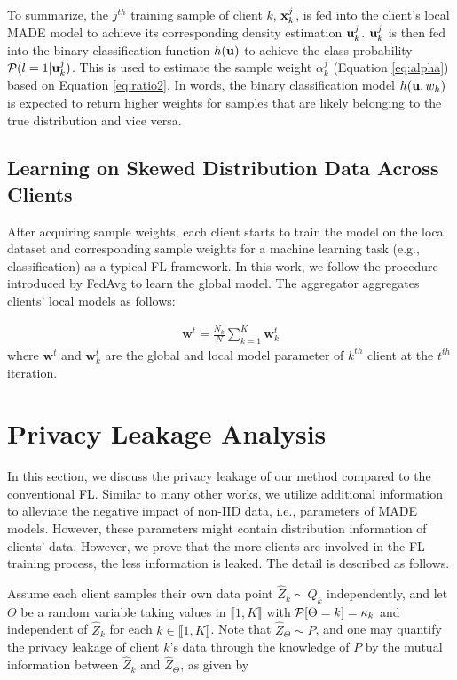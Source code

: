 To summarize, the $j^{th}$ training sample of client $k$, $\mathbf{x}_k^j$, is fed into the client's local MADE model to achieve its corresponding density estimation $\mathbf{u}{}_k^j$. $\mathbf{u}{}_k^j$ is then fed into the binary classification function $h(\mathbf{u})$ to achieve the class probability $ \mathcal{P}(l=1|\mathbf{u}_k^j ) $. This is used to estimate the sample weight $\alpha_k^j$ (Equation \ref{eq:alpha}) based on Equation \ref{eq:ratio2}. In words, the binary classification model $h(\mathbf{u},w_h)$ is expected to return higher weights for samples that are likely belonging to the true distribution and vice versa. 

\subsection{Learning on Skewed Distribution Data Across Clients }
After acquiring sample weights, each client starts to train the model on the local dataset and corresponding sample weights for a machine learning task (e.g., classification) as a typical FL framework. In this work, we follow the procedure introduced by FedAvg to learn the global model. The aggregator aggregates clients' local models as follows:

\begin{equation}
\begin{aligned}
\mathbf{w}^t = \frac{N_k}{N}\sum_{k=1}^{K} \mathbf{w}^t_k 
\end{aligned}
\end{equation}
where $\mathbf{w}^t$ and $\mathbf{w}^t_k$ are the global and local model parameter of $k^{th}$ client at the $t^{th}$ iteration.


\section{Privacy Leakage Analysis}
\label{sec:FedPrivacyAnalysis}
In this section, we discuss the privacy leakage of our method compared to the conventional FL. Similar to many other works, we utilize additional information to alleviate the negative impact of non-IID data, i.e., parameters of MADE models. However, these parameters might contain distribution information of clients’ data. However, we prove that the more clients are involved in the FL training process, the less information is leaked. The detail is described as follows. 

Assume each client samples their own data point ${\hat Z}_k \sim Q_k$ independently, and let  $\Theta$ be a random variable taking values in $\llbracket 1,K \rrbracket$ with $\mathcal{P}[\Theta = k] = \kappa_k$ and independent of ${\hat Z}_k$ for each $k \in \llbracket 1,K \rrbracket$. Note that ${\hat Z}_\Theta \sim P$, and one may quantify the privacy leakage of client $k$'s data through the knowledge of $P$ by the mutual  information between ${\hat Z}_k$ and ${\hat Z}_\Theta$, as given by

